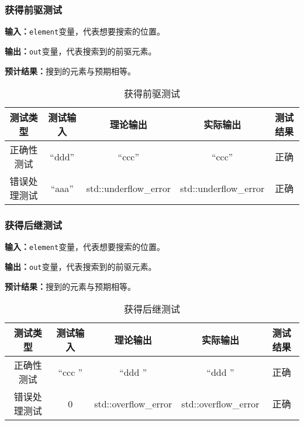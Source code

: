 \subsubsection{获得前驱测试}
\textbf{输入：}\texttt{element}变量，代表想要搜索的位置。
\par
\textbf{输出：}\texttt{out}变量，代表搜索到的前驱元素。
\par
\textbf{预计结果：}搜到的元素与预期相等。
\begin{table}[h]
    \centering
    \caption{获得前驱测试}
    \begin{tabular}{@{}ccccc@{}}
        \toprule
        \multicolumn{1}{c}{测试类型}    & \multicolumn{1}{c}{测试输入} & \multicolumn{1}{c}{理论输出} & \multicolumn{1}{c}{实际输出} &
        \multicolumn{1}{c}{测试结果} \\ \midrule
        \multicolumn{1}{c|}{正确性测试}  & ``ddd''&``ccc''&``ccc''&正确\\
        \multicolumn{1}{c|}{错误处理测试} & ``aaa''& std::underflow\_error& std::underflow\_error& 正确\\ \bottomrule
    \end{tabular}
    \label{tab:priortest2}
\end{table}

\subsubsection{获得后继测试}
\textbf{输入：}\texttt{element}变量，代表想要搜索的位置。
\par
\textbf{输出：}\texttt{out}变量，代表搜索到的前驱元素。
\par
\textbf{预计结果：}搜到的元素与预期相等。
\begin{table}[h]
    \centering
    \caption{获得后继测试}
    \begin{tabular}{@{}ccccc@{}}
        \toprule
        \multicolumn{1}{c}{测试类型}    & \multicolumn{1}{c}{测试输入} & \multicolumn{1}{c}{理论输出} & \multicolumn{1}{c}{实际输出} &
        \multicolumn{1}{c}{测试结果} \\ \midrule
        \multicolumn{1}{c|}{正确性测试}  & ``ccc ''&``ddd ''&``ddd ''&正确\\
        \multicolumn{1}{c|}{错误处理测试} & 0& std::overflow\_error& std::overflow\_error& 正确\\ \bottomrule
    \end{tabular}
    \label{tab:nexttest2}
\end{table}

